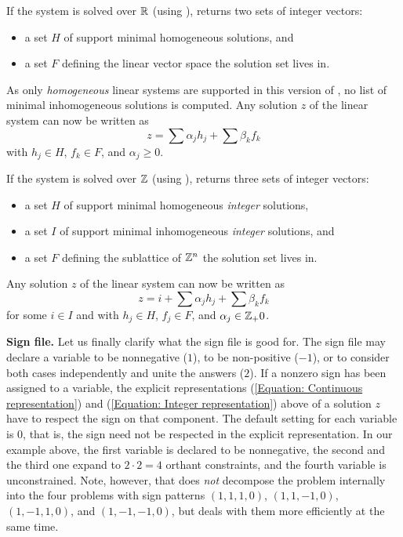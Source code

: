 If the system is solved over $\mathbb R$ (using ),
\FourTiTwo{} returns two sets of integer vectors:
\begin{itemize}
\item a set $H$ of support minimal homogeneous solutions, and
\item a set $F$ defining the linear vector space the solution set
lives in.
\end{itemize}
As only \emph{homogeneous} linear systems are supported in this
version of \FourTiTwo, no list of minimal inhomogeneous solutions is
computed. Any solution $z$ of the linear system can now be written
as
\begin{equation}\label{Equation: Continuous representation}
z=\sum \alpha_j h_j+ \sum \beta_k f_k
\end{equation}
with $h_j\in H$, $f_k\in F$, and $\alpha_j\geq 0$.

If the system is solved over $\mathbb Z$ (using ),
\FourTiTwo{} returns three sets of integer vectors:
\begin{itemize}
\item a set $H$ of support minimal homogeneous \emph{integer} solutions,
\item a set $I$ of support minimal inhomogeneous \emph{integer}
solutions, and
\item a set $F$ defining the sublattice of $\mathbb Z^n$ the solution set
lives in.
\end{itemize}
Any solution $z$ of the linear system can now be written as
\begin{equation}\label{Equation: Integer representation}
z=i+ \sum \alpha_j h_j+\sum \beta_k f_k
\end{equation}
for some $i\in I$ and with $h_j\in H$, $f_j\in F$, and
$\alpha_j\in\mathbb Z_+0$.

{\bf Sign file.} Let us finally clarify what the sign file
 is good for. The sign file may declare a variable
to be nonnegative ($1$), to be non-positive ($-1$), or to consider
both cases independently and unite the answers ($2$). If a nonzero
sign has been assigned to a variable, the explicit representations
(\ref{Equation: Continuous representation}) and (\ref{Equation:
Integer representation}) above of a solution $z$ have to respect the
sign on that component. The default setting for each variable is
$0$, that is, the sign need not be respected in the explicit
representation. In our example above, the first variable is declared
to be nonnegative, the second and the third one expand to $2\cdot
2=4$ orthant constraints, and the fourth variable is unconstrained.
Note, however, that \FourTiTwo{} does \emph{not} decompose the
problem internally into the four problems with sign patterns
$(1,1,1,0)$, $(1,1,-1,0)$, $(1,-1,1,0)$, and $(1,-1,-1,0)$, but
deals with them more efficiently at the same time.
